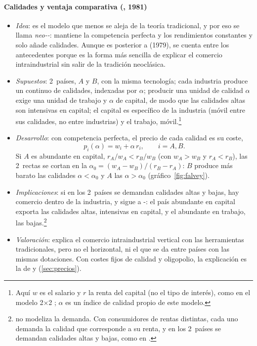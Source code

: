 \documentclass[11pt]{article}
\begin{document}
\paragraph{Calidades y ventaja comparativa (, 1981)}

\begin{itemize}
\item \emph{Idea}: es el modelo que menos se aleja de la teoría tradicional, y por eso se llama \emph{neo--}: mantiene la competencia perfecta y los rendimientos constantes y solo añade calidades\nocite{Falvey1981Commercial}. Aunque es posterior a  (1979), se cuenta entre los antecedentes porque es la forma más sencilla de explicar el comercio intraindustrial sin salir de la tradición neoclásica.
\item \emph{Supuestos}: 2~países, $A$ y $B$, con la misma tecnología; cada industria produce un continuo de calidades, indexadas por $\alpha$; producir una unidad de calidad $\alpha$ exige una unidad de trabajo y $\alpha$ de capital, de modo que las calidades altas son intensivas en capital; el capital es específico de la industria (móvil entre sus calidades, no entre industrias) y el trabajo, móvil.\footnote{Aquí $w$ es el salario y $r$ la renta del capital (no el tipo de interés), como en el modelo 2×2 ; $\alpha$ es un índice de calidad propio de este modelo.}
\item \emph{Desarrollo}: con competencia perfecta, el precio de cada calidad es su coste,
  $$p_i(\alpha)=w_i+\alpha\,r_i,\qquad i=A,B.$$
  Si $A$ es abundante en capital, $r_A/w_A<r_B/w_B$ (con $w_A>w_B$ y $r_A<r_B$), las 2~rectas se cortan en la  $\alpha_0=(w_A-w_B)/(r_B-r_A)$: $B$ produce más barato las calidades $\alpha<\alpha_0$ y $A$ las $\alpha>\alpha_0$ (gráfico~\ref{fig:falvey}).
\item \emph{Implicaciones}: si en los 2~países se demandan calidades altas y bajas, hay comercio dentro de la industria, y sigue a -: el país abundante en capital exporta las calidades altas, intensivas en capital, y el abundante en trabajo, las bajas.\footnote{\textcite{Falvey1981Commercial} no modeliza la demanda. Con consumidores de rentas distintas, cada uno demanda la calidad que corresponde a su renta, y en los 2~países se demandan calidades altas y bajas, como en .}
\item \emph{Valoración}: explica el comercio intraindustrial vertical con las herramientas tradicionales, pero no el horizontal, ni el que se da entre países con las mismas dotaciones. Con costes fijos de calidad y oligopolio, la explicación es la de  y  (\ref{sec:precios}).
\end{itemize}
\end{document}
